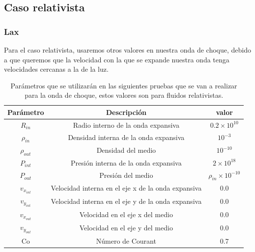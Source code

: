 \documentclass[12pt,a4paper]{book}
\begin{document}
\subsection{Caso relativista} 

\subsubsection{Lax}
Para el caso relativista, usaremos otros valores en nuestra onda de choque, debido a que queremos que la velocidad con la que se expande nuestra onda tenga velocidades cercanas a la de la luz.

\begin{table}[htbp]\label{Tabla_parametros_relatividad}
\begin{center}
\begin{tabular}{|c|c|c|}
\hline 
\textbf{Parámetro} & \textbf{Descripción} & \textbf{valor} \\ 
\hline 
$R_{in}$ & Radio interno de la onda expansiva & $0.2\times10^{10}$ \\ 
\hline 
$\rho_{in}$ &  Densidad interna de la onda expansiva & $10^{-3}$ \\ 
\hline 
$\rho_{out}$ &  Densidad del medio  & $10^{-10}$ \\
\hline 
$P_{int}$ & Presión interna de la onda expansiva & $2\times10^{18}$ \\ 
\hline 
$P_{out}$ &  Presión del medio  & $\rho_{in} \times 10^{-10}$ \\ 
\hline 
$v_{x_{int}}$ & Velocidad interna en el eje x de la onda expansiva & 0.0 \\ 
\hline 
$v_{y_{int}}$ & Velocidad interna en el eje y de la onda expansiva & 0.0 \\ 
\hline 
$v_{x_{out}}$ & Velocidad en el eje x del medio & 0.0 \\
\hline 
$v_{y_{out}}$ & Velocidad en el eje y del medio & 0.0 \\ 
\hline 
Co & Número de Courant & 0.7 \\ 
\hline 
\end{tabular}
\caption{Parámetros que se utilizarán en las siguientes pruebas que se van a realizar para la onda de choque, estos valores son para fluidos relativistas.}
\end{center}
\end{table}
\end{document}
